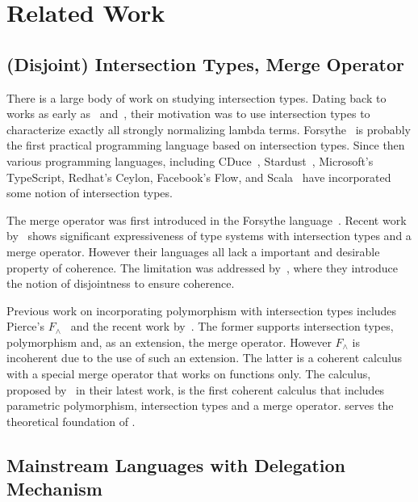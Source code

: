 \section{Related Work}

\subsection{(Disjoint) Intersection Types, Merge Operator}

There is a large body of work on studying intersection types. Dating back to
works as early as~\citet{coppo1981functional} and~\citet{pottinger1980type},
their motivation was to use intersection types to characterize exactly all
strongly normalizing lambda terms. Forsythe~\cite{reynolds1997design} is
probably the first practical programming language based on intersection types.
Since then various programming languages, including
CDuce~\cite{benzaken2003cduce}, Stardust~\cite{Dunfield07:Stardust}, Microsoft's
TypeScript, Redhat's Ceylon, Facebook's Flow, and Scala~\cite{scala-overview}
have incorporated some notion of intersection types.

The merge operator was first introduced in the Forsythe
language~\cite{reynolds1997design}. Recent work
by~\citet{dunfield2014elaborating} shows significant expressiveness of type
systems with intersection types and a merge operator. However their languages
all lack a important and desirable property of coherence. The limitation was
addressed by~\citet{oliveira2016disjoint}, where they introduce the notion of
disjointness to ensure coherence.

Previous work on incorporating polymorphism with intersection types includes
Pierce's $F_\wedge$~\cite{pierce1991programming2} and the recent work
by~\citet{Castagna:2014}. The former supports intersection types, polymorphism
and, as an extension, the merge operator. However $F_\wedge$ is incoherent due
to the use of such an extension. The latter is a coherent calculus with a
special merge operator that works on functions only. The \bname calculus,
proposed by~\citet{alpuimdisjoint} in their latest work, is the first coherent
calculus that includes parametric polymorphism, intersection types and a merge
operator. \bname serves the theoretical foundation of \name.


\subsection{Mainstream Languages with Delegation Mechanism}

